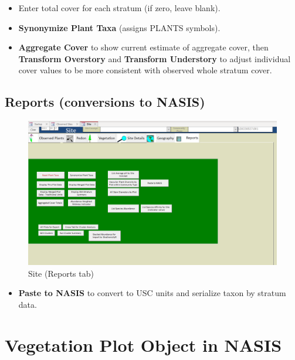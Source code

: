 \documentclass[
]{book}
\providecommand{\tightlist}{%
  \setlength{\itemsep}{0pt}\setlength{\parskip}{0pt}}
\begin{document}
\begin{itemize}
\item
  Enter total cover for each stratum (if zero, leave blank).
\item
  \textbf{Synonymize Plant Taxa} (assigns PLANTS symbols).
\item
  \textbf{Aggregate Cover} to show current estimate of aggregate cover, then \textbf{Transform Overstory} and \textbf{Transform Understory} to adjust individual cover values to be more consistent with observed whole stratum cover.
\end{itemize}

\hypertarget{reports-conversions-to-nasis}{%
\subsection*{Reports (conversions to NASIS)}\label{reports-conversions-to-nasis}}

\begin{figure}
\centering
\includegraphics{static-figures/veglog5.png}
\caption{Site (Reports tab)}
\end{figure}

\begin{itemize}
\tightlist
\item
  \textbf{Paste to NASIS} to convert to USC units and serialize taxon by stratum data.
\end{itemize}

\hypertarget{vegetation-plot-object-in-nasis}{%
\section{Vegetation Plot Object in NASIS}\label{vegetation-plot-object-in-nasis}}
\end{document}

